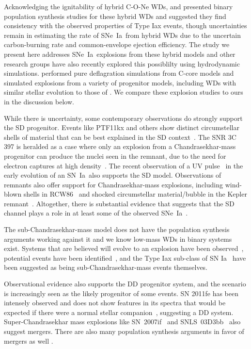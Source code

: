 \documentclass[iop,apj]{emulateapj}
\newcommand{\SNeIa}{SNe~Ia}
\newcommand{\SNIa}{SN~Ia}
\begin{document}
Acknowledging the ignitability of hybrid C-O-Ne WDs,
\citet{Wangetal2014} and \citet{Mengetal2014} presented binary
population synthesis studies for these hybrid WDs and suggested they
find consistency with the observed properties of Type Iax events,
though uncertainties remain in estimating the rate of \SNeIa\ from
hybrid WDs due to the uncertain carbon-burning rate and
common-envelope ejection efficiency. The study we present here
addresses \SNeIa\ explosions from these hybrid models and other
research groups have also recently explored this possiblilty using
hydrodynamic simulations.  \citet{kromeretal2015} performed pure
deflagration simulations from C-core models and \citet{bravoetal2016}
simulated explosions from a variety of progenitor models, including
WDs with similar stellar evolution to those of
\citet{denissenkovetal2015}.  We compare these explosion studies to
ours in the discussion below.

While there is uncertainty, some contemporary observations do strongly
support the SD progenitor. Events like PTF11kx and others show distinct 
circumstellar shells of material that can be best explained in the SD
context~\citep{dildayetal2012,silverman:2013}. The SNR 3C 397 is heralded
as a case where only an explosion from a Chandrasekhar-mass progenitor can 
produce the nuclei seen in the remnant, due to the need for electron captures 
at high density~\citep{3c397}.  
The recent observation of a UV pulse~\citep{cao:2015,cao:2015e} in the
early evolution of an \SNIa\ also supports the SD model. 
Observations of remnants also offer support 
for Chandrasekhar-mass explosions, including wind-blown shells in 
RCW86~\citep{williams:2011} and shocked circumstellar material/bubble in the Kepler
remnant~\citep{chiotellis:2012,burkey:2013}.  Altogether, there is
substantial evidence that suggests that the SD channel plays a role in
at least some of the observed \SNeIa~\citep{baron2014}.

The sub-Chandrasekhar-mass model does not have the population
synthesis arguments working against it and we know low-mass WDs in
binary systems exist. Systems that are believed will evolve to an
explosion have been observed~\citep{kilic:2014}, potential events have
been identified~\citep{geier:2013,inserra:2015}, and the Type Iax
sub-class of SN Ia~\citep{foleyetal2013,wang:2013} have been suggested
as being sub-Chandrasekhar-mass events themselves.

Observational evidence also supports the DD progenitor system, and
the scenario is  increasingly seen as the likely progenitor of some
events. SN 2011fe has been intensely observed and does not show features
in its spectra that would be expected if there were a normal stellar
companion~\citep{graham:sn2011fe}, suggesting a DD system. Super-Chandrasekhar
mass explosions like SN~2007if~\citep{scalzo:2010,Yuan:2010} and
SNLS~03D3bb~\citep{howell+06} also suggest mergers. There are
also many population synthesis arguments in favor of mergers as well 
\citep[see][for a review]{maoz:2014}.
\end{document}

